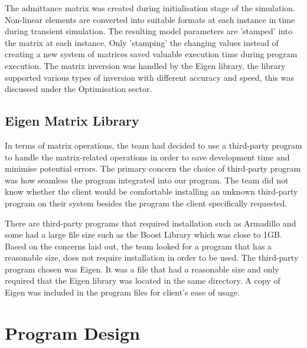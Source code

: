\documentclass[12pt,a4paper]{article}
\begin{document}
	The admittance matrix was created during initialisation stage of the simulation. Non-linear elements are converted into 
	suitable formats at each instance in time during transient simulation. The resulting model parameters are 'stamped' into the matrix
	at each instance. Only 'stamping' the changing values instead of creating a new system of matrices saved valuable execution time
	during program execution. The matrix inversion was handled by the Eigen library, the library supported various types of 
	inversion with different accuracy and speed, this was discussed under the Optimisation sector.

	\subsection{Eigen Matrix Library}
	In terms of matrix operations, the team had decided to use a third-party program to handle the matrix-related operations in
	order to save development time and minimise potential errors.
	The primary concern the choice of third-party program was how seamless the program integrated into our program. 
	The team did not know whether the client would be comfortable installing an unknown third-party program on their system 
	besides the program the client specifically requested.\par
	There are third-party programs that required installation such as Armadillo and some had a large file size such as the 
	Boost Library which was close to 1GB.
	Based on the concerns laid out, the team looked for a program that has a reasonable size, does not require installation 
	in order to be used. The third-party program chosen was Eigen. It was a file that had a reasonable size and only required that the
	Eigen library was located in the same directory. A copy of Eigen was included in the program files for client's ease of usage.
	\pagebreak

\section{Program Design}
\end{document}
